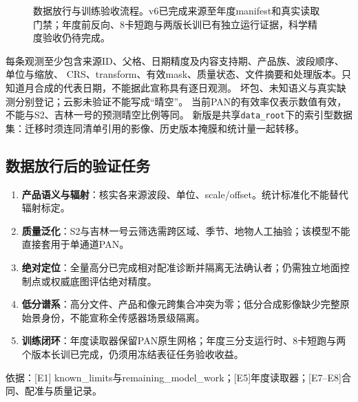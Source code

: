 \documentclass[UTF8,fontset=fandol,zihao=5,a4paper]{ctexart}
\newcommand{\source}[1]{\par{\footnotesize\color{muted}依据：#1}\par}
\begin{document}
\begin{figure}[h]
\centering
{}
\caption{数据放行与训练验收流程。v6已完成来源至年度manifest和真实读取门禁；年度前反向、8卡短跑与两版长训已有独立运行证据，科学精度验收仍待完成。}
\end{figure}

每条观测至少包含来源ID、父格、日期精度及内容支持期、产品族、波段顺序、单位与缩放、
CRS、transform、有效mask、质量状态、文件摘要和处理版本。只知道月合成的代表日期，不能据此宣称具有逐日观测。
坏包、未知语义与真实缺测分别登记；云影未验证不能写成“晴空”。
当前PAN的有效率仅表示数值有效，不能与S2、吉林一号的预测晴空比例等同。
新版是共享\texttt{data\_root}下的索引型数据集：迁移时须连同清单引用的影像、历史版本掩膜和统计量一起转移。

\subsection{数据放行后的验证任务}
\begin{enumerate}
\item \textbf{产品语义与辐射}：核实各来源波段、单位、scale/offset。统计标准化不能替代辐射标定。
\item \textbf{质量泛化}：S2与吉林一号云筛选需跨区域、季节、地物人工抽验；该模型不能直接套用于单通道PAN。
\item \textbf{绝对定位}：全量高分已完成相对配准诊断并隔离无法确认者；仍需独立地面控制点或权威底图评估绝对精度。
\item \textbf{低分谱系}：高分文件、产品和像元跨集合冲突为零；低分合成影像缺少完整原始景身份，不能宣称全传感器场景级隔离。
\item \textbf{训练闭环}：年度读取器保留PAN原生网格；年度三分支运行时、8卡短跑与两个版本长训已完成，仍须用冻结表征任务验收收益。
\end{enumerate}
\source{[E1] known\_limits与remaining\_model\_work；[E5]年度读取器；[E7--E8]合同、配准与质量记录。}
\end{document}
